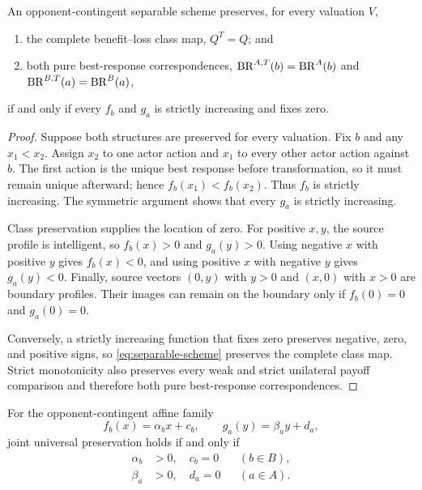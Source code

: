 \begin{theorem}
\label{thm:joint-preservation}
An opponent-contingent separable scheme preserves, for every valuation $V$,
\begin{enumerate}[label=(\roman*)]
\item the complete benefit--loss class map, $Q^T=Q$; and
\item both pure best-response correspondences,
$\operatorname{BR}^{A,T}(b)=\operatorname{BR}^A(b)$ and $\operatorname{BR}^{B,T}(a)=\operatorname{BR}^B(a)$,
\end{enumerate}
if and only if every $f_b$ and $g_a$ is strictly increasing and fixes zero.
\end{theorem}

\begin{proof}
Suppose both structures are preserved for every valuation. Fix $b$ and any
$x_1<x_2$. Assign $x_2$ to one actor action and $x_1$ to every other actor
action against $b$. The first action is the unique best response before
transformation, so it must remain unique afterward; hence
$f_b(x_1)<f_b(x_2)$. Thus $f_b$ is strictly increasing. The symmetric argument
shows that every $g_a$ is strictly increasing.

Class preservation supplies the location of zero. For positive $x,y$, the
source profile is intelligent, so $f_b(x)>0$ and $g_a(y)>0$. Using negative
$x$ with positive $y$ gives $f_b(x)<0$, and using positive $x$ with negative
$y$ gives $g_a(y)<0$. Finally, source vectors $(0,y)$ with $y>0$ and $(x,0)$
with $x>0$ are boundary profiles. Their images can remain on the boundary only
if $f_b(0)=0$ and $g_a(0)=0$.

Conversely, a strictly increasing function that fixes zero preserves negative,
zero, and positive signs, so \eqref{eq:separable-scheme} preserves the complete
class map. Strict monotonicity also preserves every weak and strict unilateral
payoff comparison and therefore both pure best-response correspondences.
\end{proof}

\begin{corollary}
\label{cor:affine-intersection}
For the opponent-contingent affine family
\[
f_b(x)=\alpha_bx+c_b,
\qquad
g_a(y)=\beta_ay+d_a,
\]
joint universal preservation holds if and only if
\[
\begin{aligned}
\alpha_b&>0,\quad c_b=0 &&(b\in B),\\
\beta_a&>0,\quad d_a=0 &&(a\in A).
\end{aligned}
\]
\end{corollary}

